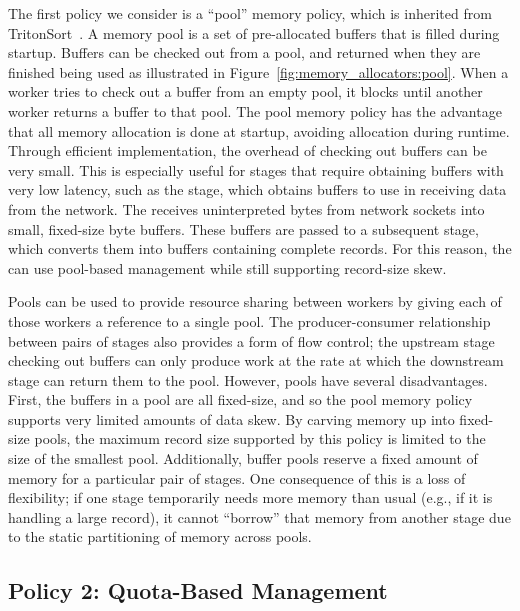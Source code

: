 The first policy we consider is a ``pool'' memory policy, which is inherited
from TritonSort~\cite{tritonsort}.  A memory pool is a set of pre-allocated
buffers that is filled during startup.  Buffers can be checked out from a pool,
and returned when they are finished being used as illustrated in
Figure~\ref{fig:memory_allocators:pool}.  When a worker tries to check out a
buffer from an empty pool, it blocks until another worker returns a buffer to
that pool.  The pool memory policy has the advantage that all memory allocation
is done at startup, avoiding allocation during runtime.  Through efficient
implementation, the overhead of checking out buffers can be very small.  This
is especially useful for stages that require obtaining buffers with very low
latency, such as the \Receiver stage, which obtains buffers to use in receiving
data from the network.  The \receiver receives uninterpreted bytes from network
sockets into small, fixed-size byte buffers.  These buffers are passed to a
subsequent stage, which converts them into buffers containing complete records.
For this reason, the \receiver can use pool-based management while still
supporting record-size skew.

Pools can be used to provide resource sharing between workers by giving each of
those workers a reference to a single pool.  The producer-consumer relationship
between pairs of stages also provides a form of flow control; the upstream
stage checking out buffers can only produce work at the rate at which the
downstream stage can return them to the pool.  However, pools have several
disadvantages.  First, the buffers in a pool are all fixed-size, and so
the pool memory policy supports very limited amounts of data skew.  By
carving memory up into fixed-size pools, the maximum record size supported by
this policy is limited to the size of the smallest pool.  Additionally, buffer
pools reserve a fixed amount of memory for a particular pair of stages. One
consequence of this is a loss of flexibility; if one stage temporarily needs
more memory than usual (e.g., if it is handling a large record), it cannot
``borrow'' that memory from another stage due to the static partitioning of
memory across pools.

\subsection{Policy 2: Quota-Based Management}

